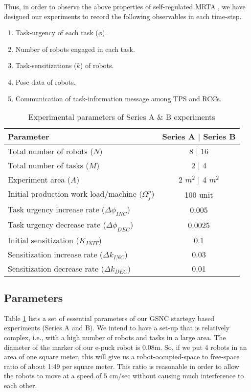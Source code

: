 \documentclass[journal]{IEEEtran}
\begin{document}
Thus, in order to observe the above properties of self-regulated MRTA , we have designed our experiments to record the following  observables in each time-step.
\begin{enumerate}
\item Task-urgency of each task ($\phi$).
\item Number of robots engaged in each task.
\item Task-sensitizations ($k$) of robots.
\item Pose data of robots.
\item Communication of task-information message among TPS and RCCs.  
\end{enumerate}
\begin{table}
\caption{Experimental parameters of Series A \& B experiments}
\label{table:params}
\begin{center}
\begin{tabular}{|p{1.5in}|c|}
\hline Parameter & Series A $\mid$ Series B\\
\hline Total number of robots ($N$) & \hspace*{0.1cm} 8 $\mid$ 16\\
\hline Total number of tasks ($M$) & 2 $\mid$ 4\\
\hline Experiment area ($A$) & 2 $m^2$ $\mid$  4 $m^2$\\
\hline Initial production work load/machine ($\Omega_{j}^{p}$) & 100 unit \\
\hline Task urgency increase rate ($\Delta\phi_{INC}$) & 0.005\\
\hline Task urgency decrease rate ($\Delta\phi_{DEC}$) & 0.0025\\
\hline Initial sensitization ($K_{INIT}$) & 0.1\\
\hline Sensitization increase rate ($\Delta k_{INC}$) & 0.03\\
\hline Sensitization decrease rate ($\Delta k_{DEC}$) & 0.01\\
\hline
\end{tabular}
\end{center}
\end{table}
\subsection{Parameters}
Table \ref{table:params} lists a set of essential parameters of our GSNC startegy based experiments (Series A and B). We intend to have a set-up that is relatively complex, i.e., with a high number of robots and tasks in a large area. The diameter of the marker of our e-puck robot is 0.08m. So, if we put 4 robots in an area of one square meter, this will give us a robot-occupied-space to free-space ratio of about 1:49 per square meter. This ratio is reasonable in order to allow the robots to move at a speed of 5 cm/sec without causing much interference to each other. 
\end{document}
